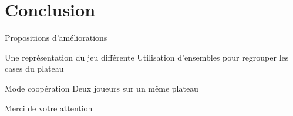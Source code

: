 \documentclass{beamer}
\begin{document}
\section{Conclusion}
\begin{frame}{Propositions d'améliorations}
  \begin{block}{Une représentation du jeu différente}
    Utilisation d'ensembles pour regrouper les cases du plateau
  \end{block}
  \vfill{}
  \begin{block}{Mode coopération}
    Deux joueurs sur un même plateau
  \end{block}
\end{frame}

\begin{frame}[standout]
  Merci de votre attention
\end{frame}
\end{document}
